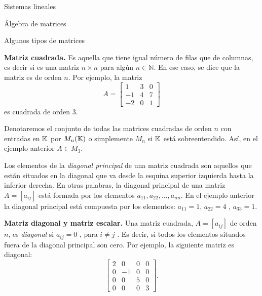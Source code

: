 \begin{chapter}{Sistemas lineales}
\begin{section}{\'Algebra de matrices}
            
            \begin{subsection}{Algunos tipos de matrices}
                
                \textbf{Matriz cuadrada.} Es aquella que tiene igual número de filas que de columnas, es decir si es una matriz $n \times n$ para algún $n \in\mathbb N$. En ese caso, se dice que la matriz es de orden $n$. Por ejemplo, la matriz
                \begin{equation*}
                A= \begin{bmatrix}
                1&3&0\\-1&4&7\\-2&0&1
                \end{bmatrix}
                \end{equation*}
                es cuadrada de orden 3.
                
                Denotaremos el conjunto de todas las matrices cuadradas de orden $n$ con entradas en $\mathbb K$ por $M_n(\mathbb K)$ o simplemente $M_n$ si $\mathbb K$  está sobreentendido. Así, en el 	ejemplo anterior $A \in M_3$.
                
                Los elementos de la \textit{diagonal principal} de una matriz cuadrada son aquellos que están situados
                en la diagonal que va desde la esquina superior izquierda hasta la inferior derecha. En otras
                palabras, la diagonal principal de una matriz $A=[a_{ij}]$ está formada por los elementos
                $a_{11},a_{22},\ldots,a_{nn}$.  En el ejemplo anterior la diagonal principal está compuesta por los elementos: $a_{11} = 1$, $a_{22} = 4$ , $a_{33} = 1$.

                \textbf{Matriz diagonal y matriz escalar.} Una matriz cuadrada, $A=[a_{ij}]$ de orden $n$, es \textit{diagonal} si $a_{ij}  =0$ , para $i \not= j$ . Es decir, si todos los elementos situados fuera de la diagonal principal son cero. Por ejemplo, la siguiente matriz es diagonal:
                \begin{equation}
                \begin{bmatrix}
                2&0&0&0\\0&-1&0&0\\0&0&5&0\\0&0&0&3
                \end{bmatrix}.
                \end{equation}
                

\end{subsection}
\end{section}
\end{chapter}
